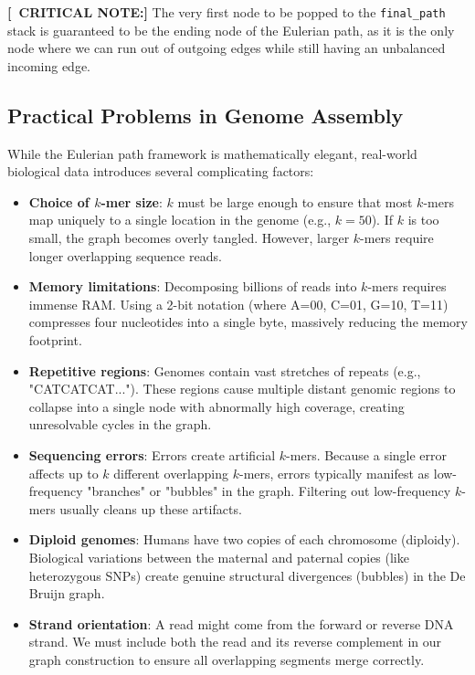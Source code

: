 \documentclass[11pt,a4paper]{article}
\newcommand{\sta}{\textbf{[\textasteriskcentered\ CRITICAL NOTE:] }}
\begin{document}
\sta The very first node to be popped to the \texttt{final\_path} stack is guaranteed to be the ending node of the Eulerian path, as it is the only node where we can run out of outgoing edges while still having an unbalanced incoming edge.

\subsection{Practical Problems in Genome Assembly}

While the Eulerian path framework is mathematically elegant, real-world biological data introduces several complicating factors:

\begin{itemize}
    \item \textbf{Choice of $k$-mer size}: $k$ must be large enough to ensure that most $k$-mers map uniquely to a single location in the genome (e.g., $k=50$). If $k$ is too small, the graph becomes overly tangled. However, larger $k$-mers require longer overlapping sequence reads.
    \item \textbf{Memory limitations}: Decomposing billions of reads into $k$-mers requires immense RAM. Using a 2-bit notation (where A=00, C=01, G=10, T=11) compresses four nucleotides into a single byte, massively reducing the memory footprint.
    \item \textbf{Repetitive regions}: Genomes contain vast stretches of repeats (e.g., "CATCATCAT..."). These regions cause multiple distant genomic regions to collapse into a single node with abnormally high coverage, creating unresolvable cycles in the graph.
    \item \textbf{Sequencing errors}: Errors create artificial $k$-mers. Because a single error affects up to $k$ different overlapping $k$-mers, errors typically manifest as low-frequency "branches" or "bubbles" in the graph. Filtering out low-frequency $k$-mers usually cleans up these artifacts.
    \item \textbf{Diploid genomes}: Humans have two copies of each chromosome (diploidy). Biological variations between the maternal and paternal copies (like heterozygous SNPs) create genuine structural divergences (bubbles) in the De Bruijn graph.
    \item \textbf{Strand orientation}: A read might come from the forward or reverse DNA strand. We must include both the read and its reverse complement in our graph construction to ensure all overlapping segments merge correctly.
\end{itemize}
\end{document}
